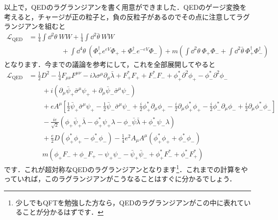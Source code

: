 \documentclass[a4paper,uplatex,dvipdfmx]{jsarticle}
\theoremstyle{definition}
\begin{document}
以上で，QEDのラグランジアンを書く用意ができました．QEDのゲージ変換を考えると，チャージが正の粒子と，負の反粒子があるのでその点に注意してラグランジアンを組むと
\begin{align}
  \mathcal{L}_{\text{QED}}
  &=
  \frac{1}{4}
  \int\dd^2\theta\ WW
  +
  \frac{1}{4}
  \int\dd^2\bar{\theta}\ \overline{WW}
  \nonumber
  \\
  &\hspace{2cm}
  +
  \int\dd^4\theta\ 
  (
    \Phi_{+}^{\dag}e^{eV}\Phi_{+}
    +
    \Phi_{-}^{\dag}e^{-eV}\Phi_{-}
  )
  +
  m
  \left( 
    \int\dd^2\theta\ \Phi_{+}\Phi_{-}
    +
    \int\dd^2\bar{\theta}\ \Phi_{+}^{\dag}\Phi_{-}^{\dag}
  \right)
\end{align}
となります．今までの議論を参考にして，これを全部展開してやると
\begin{align}
  \mathcal{L}_{\text{QED}}
  &=
  \frac{1}{2}D^2
  -
  \frac{1}{4}F_{\mu\nu}F^{\mu\nu}
  -
  i\lambda\sigma^{\mu}\partial_{\mu}\bar{\lambda}
  +
  F_{+}^{*}F_{+}
  +
  F_{-}^{*}F_{-}
  +
  \phi^{*}_{+}\partial^2\phi_{+}
  -
  \phi^{*}_{-}\partial^2\phi_{-}
  \nonumber
  \\
  &\qquad
  +
  i
  (
    \partial_{\mu}\bar{\psi}_{+}\bar{\sigma}^{\mu}\psi_{+}
    +
    \partial_{\mu}\bar{\psi}_{-}\bar{\sigma}^{\mu}\psi_{-}
  )
  \nonumber
  \\
  &\qquad
  +
  eA^{\mu}
  \left[  
    \frac{1}{2}\bar{\psi}_{+}\bar{\sigma}^{\mu}\psi_{+}
    -
    \frac{1}{2}\bar{\psi}_{-}\bar{\sigma}^{\mu}\psi_{-}
    +
    \frac{i}{2}\phi_{+}^{*}\partial_{\mu}\phi_{+}
    -
    \frac{i}{2}\partial_{\mu}\phi_{+}^{*}\phi_{+}
    -
    \frac{i}{2}\phi_{-}^{*}\partial_{\mu}\phi_{-}
    +
    \frac{i}{2}\partial_{\mu}\phi_{-}^{*}\phi_{-}
  \right]
  \nonumber
  \\
  &\qquad
  -\frac{ie}{\sqrt{2}}
  (
    \phi_{+}\bar{\psi}_{+}\bar{\lambda}
    -
    \phi_{+}^{*}\psi_{+}\lambda
    -
    \phi_{-}\bar{\psi}\bar{\lambda}
    +
    \phi_{-}^{*}\psi_{-}\lambda
  )
  \nonumber
  \\
  &\qquad
  +
  \frac{e}{2}D(\phi^{*}_{+}\phi_{+}-\phi^{*}_{-}\phi_{-})
  -
  \frac{1}{4}e^{2}A_{\mu}A^{\mu}
  (\phi^{*}_{+}\phi_{+}+\phi^{*}_{-}\phi_{-})
  \nonumber
  \\
  &\qquad
  m
  (
    \phi_{+}F_{-}
    +
    \phi_{-}F_{+}
    -
    \psi_{+}\psi_{-}
    -
    \bar{\psi}_{+}\bar{\psi}_{-}
    +
    \phi_{+}^{*}F_{-}^{*}
    +
    \phi_{-}^{*}F_{+}^{*}
  )
\end{align}
です．これが超対称なQEDのラグランジアンとなります\footnote{
  少しでもQFTを勉強した方なら，QEDのラグランジアンがこの中に表れていることが分かるはずです．
}．これまでの計算をやっていれば，このラグランジアンがこうなることはすぐに分かるでしょう．
\end{document}
